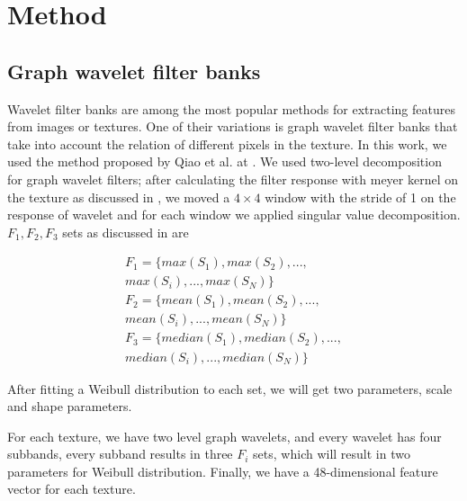 \documentclass[conference]{IEEEtran}
\begin{document}
\section{Method}
\subsection{\textbf{Graph wavelet filter banks}}

Wavelet filter banks are among the most popular methods for extracting features from images or textures. One of their variations is graph wavelet filter banks that take into account the relation of different pixels in the texture. In this work, we used the method proposed by Qiao et al. at \cite{wavelet}. We used two-level decomposition for graph wavelet filters; after calculating the filter response with meyer kernel on the texture as discussed in \cite{wavelet}, we moved a $4\times4$ window with the stride of 1 on the response of wavelet and for each window we applied singular value decomposition. $F_1 , F_2, F_3$ sets as discussed in \cite{wavelet} are

\begin{equation}
\begin{multlined}
F_1=\{ max(S_1),max(S_2),...,\\max(S_i),...,max(S_N)\}\\
F_2=\{ mean(S_1),mean(S_2),...,\\mean(S_i),...,mean(S_N)\}\\
F_3=\{ median(S_1),median(S_2),...,\\median(S_i),...,median(S_N)\}
\end{multlined}
\end{equation}

After fitting a Weibull distribution to each set, we will get two parameters, scale and shape parameters.

For each texture, we have two level graph wavelets, and every wavelet has four subbands, every subband results in three $F_i$ sets, which will result in two parameters for Weibull distribution. Finally, we have a 48-dimensional feature vector for each texture.
\end{document}
